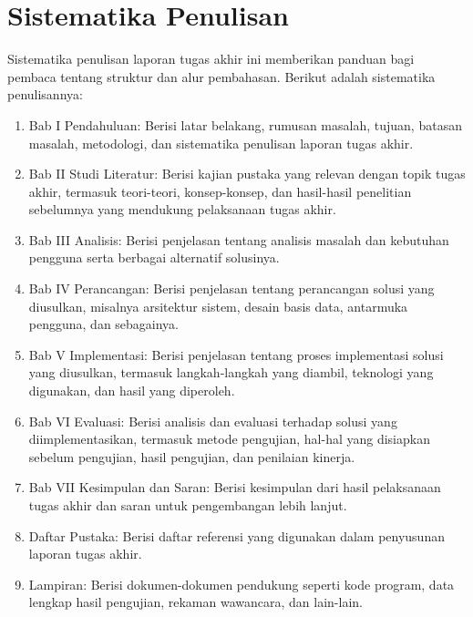 \section{Sistematika Penulisan}
Sistematika penulisan laporan tugas akhir ini memberikan panduan bagi pembaca tentang struktur dan alur pembahasan. Berikut adalah sistematika penulisannya:
\begin{enumerate}
\item   Bab I Pendahuluan: Berisi latar belakang, rumusan masalah, tujuan, batasan masalah, metodologi, dan sistematika penulisan laporan tugas akhir.
\item   Bab II Studi Literatur: Berisi kajian pustaka yang relevan dengan topik tugas akhir, termasuk teori-teori, konsep-konsep, dan hasil-hasil penelitian sebelumnya yang mendukung pelaksanaan tugas akhir.
\item   Bab III Analisis: Berisi penjelasan tentang analisis masalah dan kebutuhan pengguna serta berbagai alternatif solusinya.
\item   Bab IV Perancangan: Berisi penjelasan tentang perancangan solusi yang diusulkan, misalnya arsitektur sistem, desain basis data, antarmuka pengguna, dan sebagainya.
\item   Bab V Implementasi: Berisi penjelasan tentang proses implementasi solusi yang diusulkan, termasuk langkah-langkah yang diambil, teknologi yang digunakan, dan hasil yang diperoleh.
\item   Bab VI Evaluasi: Berisi analisis dan evaluasi terhadap solusi yang diimplementasikan, termasuk metode pengujian, hal-hal yang disiapkan sebelum pengujian, hasil pengujian, dan penilaian kinerja.
\item   Bab VII Kesimpulan dan Saran: Berisi kesimpulan dari hasil pelaksanaan tugas akhir dan saran untuk pengembangan lebih lanjut.
\item   Daftar Pustaka: Berisi daftar referensi yang digunakan dalam penyusunan laporan tugas akhir.
\item   Lampiran: Berisi dokumen-dokumen pendukung seperti kode program, data lengkap hasil pengujian, rekaman wawancara, dan lain-lain. 
\end{enumerate}